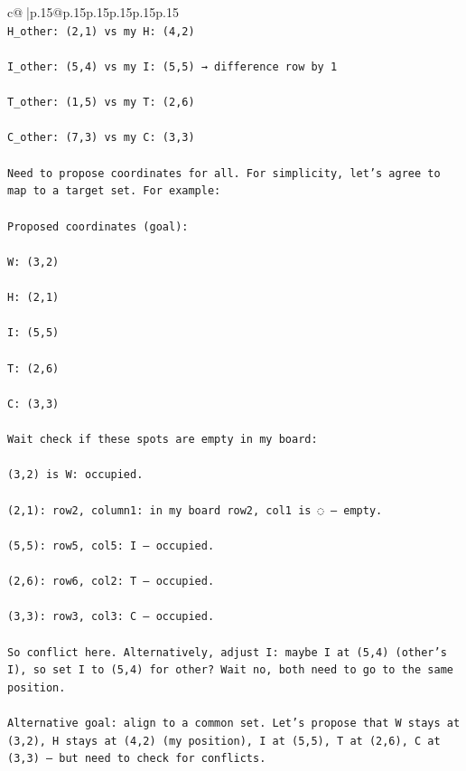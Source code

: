\documentclass{article}
\begin{document}
{\begin{supertabular}{c@{$\;$}|p{.15\linewidth}@{}p{.15\linewidth}p{.15\linewidth}p{.15\linewidth}p{.15\linewidth}p{.15\linewidth}}
{{{\\ 
\texttt{H\_other: (2,1) vs my H: (4,2)} \\
\\ 
\texttt{I\_other: (5,4) vs my I: (5,5) → difference row by 1} \\
\\ 
\texttt{T\_other: (1,5) vs my T: (2,6)} \\
\\ 
\texttt{C\_other: (7,3) vs my C: (3,3)} \\
\\ 
\texttt{Need to propose coordinates for all. For simplicity, let's agree to map to a target set. For example:} \\
\\ 
\texttt{Proposed coordinates (goal):} \\
\\ 
\texttt{W: (3,2)} \\
\\ 
\texttt{H: (2,1)} \\
\\ 
\texttt{I: (5,5)} \\
\\ 
\texttt{T: (2,6)} \\
\\ 
\texttt{C: (3,3)} \\
\\ 
\texttt{Wait check if these spots are empty in my board:} \\
\\ 
\texttt{(3,2) is W: occupied.} \\
\\ 
\texttt{(2,1): row2, column1: in my board row2, col1 is ◌ – empty.} \\
\\ 
\texttt{(5,5): row5, col5: I – occupied.} \\
\\ 
\texttt{(2,6): row6, col2: T – occupied.} \\
\\ 
\texttt{(3,3): row3, col3: C – occupied.} \\
\\ 
\texttt{So conflict here. Alternatively, adjust I: maybe I at (5,4) (other's I), so set I to (5,4) for other? Wait no, both need to go to the same position.} \\
\\ 
\texttt{Alternative goal: align to a common set. Let's propose that W stays at (3,2), H stays at (4,2) (my position), I at (5,5), T at (2,6), C at (3,3) – but need to check for conflicts.} \\
}}}
\end{supertabular}}
\end{document}
